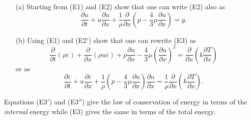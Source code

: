 \begin{exercise}\label{chap1:exer1.1}
\begin{itemize}
\item[{\rm (a)}] Starting from (E1) and (E2) show that one can write
  (E2) also as 
\begin{equation*}
\frac{\partial u}{\partial t} + u \frac{\partial u}{\partial x} +
\frac{1}{\rho} \frac{\partial}{\partial x} \left(p -\frac{4}{3} \mu
\frac{\partial u}{\partial x}\right) = g. \tag*{(E2$'$)}
\end{equation*}

\item[{\rm (b)}] Using (E1) and (E2$'$) show that one can rewrite (E3)
  as 
\begin{equation*}
\frac{\partial}{\partial t} (\rho \varepsilon)
+\frac{\partial}{\partial x} (\rho u \varepsilon) + p
\frac{\partial u}{\partial x} - \frac{4}{3} \mu \left(\frac{\partial
  u}{\partial x}\right)^2 = \frac{\partial}{\partial x} \left(k  \frac{\partial
  T}{\partial x}\right) \tag*{E3$'$}
\end{equation*}
or as
\begin{equation*}
\frac{\partial \varepsilon}{\partial t} + u \frac{\partial
  \varepsilon}{\partial x} + \frac{1}{\rho} \left(p-\frac{4}{3} \mu
\frac{\partial u}{\partial x }\right) \frac{\partial u}{\partial x} =
\frac{1}{\rho} \frac{\partial}{\partial x} \left(k \frac{\partial
  T}{\partial x}\right). 
\tag*{E3$''$}
\end{equation*}
\end{itemize}
\end{exercise}

\begin{remark}\label{chap1:rem1.1}
Equations (E3$'$) and (E3$''$) give the law of conservation of energy
in terms of the {\em internal} energy while (E3) gives the same in
terms of the total energy. 
\end{remark}


